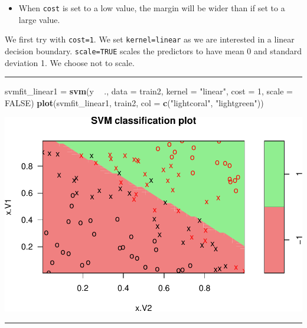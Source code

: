 \documentclass[]{article}
\newenvironment{Shaded}{\begin{snugshade}}{\end{snugshade}}
\newcommand{\DataTypeTok}[1]{\textcolor[rgb]{0.13,0.29,0.53}{#1}}
\newcommand{\DecValTok}[1]{\textcolor[rgb]{0.00,0.00,0.81}{#1}}
\newcommand{\KeywordTok}[1]{\textcolor[rgb]{0.13,0.29,0.53}{\textbf{#1}}}
\newcommand{\NormalTok}[1]{#1}
\newcommand{\OperatorTok}[1]{\textcolor[rgb]{0.81,0.36,0.00}{\textbf{#1}}}
\newcommand{\OtherTok}[1]{\textcolor[rgb]{0.56,0.35,0.01}{#1}}
\newcommand{\StringTok}[1]{\textcolor[rgb]{0.31,0.60,0.02}{#1}}
\providecommand{\tightlist}{%
  \setlength{\itemsep}{0pt}\setlength{\parskip}{0pt}}
\begin{document}
\begin{itemize}
\tightlist
\item
  When \texttt{cost} is set to a low value, the margin will be wider
  than if set to a large value.
\end{itemize}

We first try with \texttt{cost=1}. We set
\texttt{kernel=\textquotesingle{}linear\textquotesingle{}} as we are
interested in a linear decision boundary. \texttt{scale=TRUE} scales the
predictors to have mean 0 and standard deviation 1. We choose not to
scale.

\begin{center}\rule{0.5\linewidth}{\linethickness}\end{center}

\footnotesize

\begin{Shaded}
\begin{Highlighting}[]
\NormalTok{svmfit_linear1 =}\StringTok{ }\KeywordTok{svm}\NormalTok{(y }\OperatorTok{~}\StringTok{ }\NormalTok{., }\DataTypeTok{data =}\NormalTok{ train2, }\DataTypeTok{kernel =} \StringTok{"linear"}\NormalTok{, }\DataTypeTok{cost =} \DecValTok{1}\NormalTok{, }
    \DataTypeTok{scale =} \OtherTok{FALSE}\NormalTok{)}
\KeywordTok{plot}\NormalTok{(svmfit_linear1, train2, }\DataTypeTok{col =} \KeywordTok{c}\NormalTok{(}\StringTok{"lightcoral"}\NormalTok{, }\StringTok{"lightgreen"}\NormalTok{))}
\end{Highlighting}
\end{Shaded}

\includegraphics{9SVM_files/figure-latex/unnamed-chunk-11-1.pdf}

\begin{center}\rule{0.5\linewidth}{\linethickness}\end{center}
\end{document}
